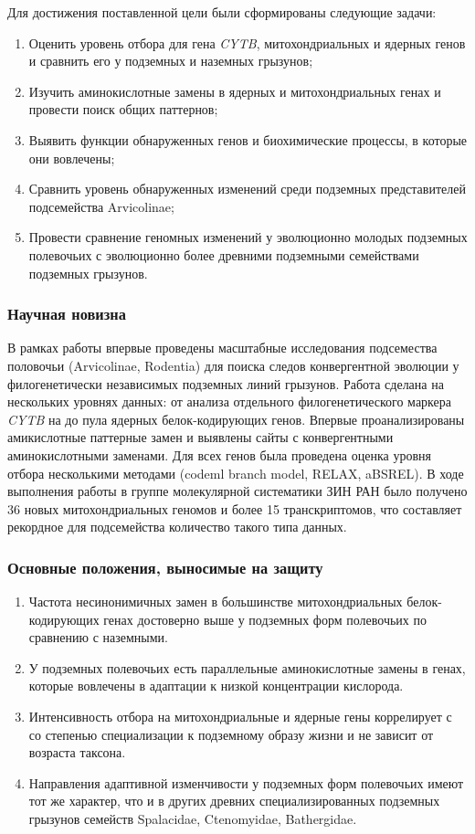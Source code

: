 Для достижения поставленной цели были сформированы следующие задачи:
\begin{enumerate}
	\item Оценить уровень отбора для гена \textit{CYTB}, митохондриальных и ядерных генов и сравнить его у подземных и наземных грызунов;
	\item Изучить аминокислотные замены в ядерных и митохондриальных генах и провести поиск общих паттернов;
	\item Выявить функции обнаруженных генов и биохимические процессы, в которые они вовлечены;
	\item Сравнить уровень обнаруженных изменений среди подземных представителей подсемейства Arvicolinae;
	\item Провести сравнение геномных изменений у эволюционно молодых подземных полевочьих с эволюционно более древними подземными семействами подземных грызунов. 
\end{enumerate}
%

\subsubsection*{Научная новизна}

В рамках работы впервые проведены масштабные исследования подсемества половочьи (Arvicolinae, Rodentia) для поиска следов конвергентной эволюции у филогенетически независимых подземных линий грызунов. Работа сделана на нескольких уровнях данных: от анализа отдельного филогенетического маркера \textit{CYTB} на до пула ядерных белок-кодирующих генов. Впервые проанализированы амикислотные паттерные замен и выявлены сайты с конвергентными аминокислотными заменами. Для всех генов была проведена оценка уровня отбора несколькими методами (codeml branch model, RELAX, aBSREL). В ходе выполнения работы в группе молекулярной систематики ЗИН РАН было получено 36 новых митохондриальных геномов и более 15 транскриптомов, что составляет рекордное для подсемейства количество такого типа данных. 
%

\subsubsection*{Основные положения, выносимые на защиту}

\begin{enumerate}
	\item Частота несинонимичных замен в большинстве митохондриальных белок-кодирующих генах достоверно выше у подземных форм полевочьих по сравнению с наземными. 
	\item У подземных полевочьих есть параллельные аминокислотные замены в генах, которые вовлечены в адаптации к низкой концентрации кислорода.
	\item Интенсивность отбора на митохондриальные и ядерные гены коррелирует с со степенью специализации к подземному образу жизни и не зависит от возраста таксона.
	\item Направления адаптивной изменчивости у подземных форм полевочьих имеют тот же характер, что и в других древних специализированных подземных грызунов семейств Spalacidae, Ctenomyidae, Bathergidae.
	 
\end{enumerate}
%


